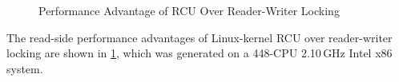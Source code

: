 \begin{figure}
\centering
{}
\caption{Performance Advantage of RCU Over Reader-Writer Locking}
\label{fig:defer:Performance Advantage of RCU Over Reader-Writer Locking}
\end{figure}

The read-side performance advantages of Linux-kernel RCU over
reader-writer locking are shown in
\cref{fig:defer:Performance Advantage of RCU Over Reader-Writer Locking},
which was generated on a 448-CPU 2.10\,GHz Intel x86 system.


